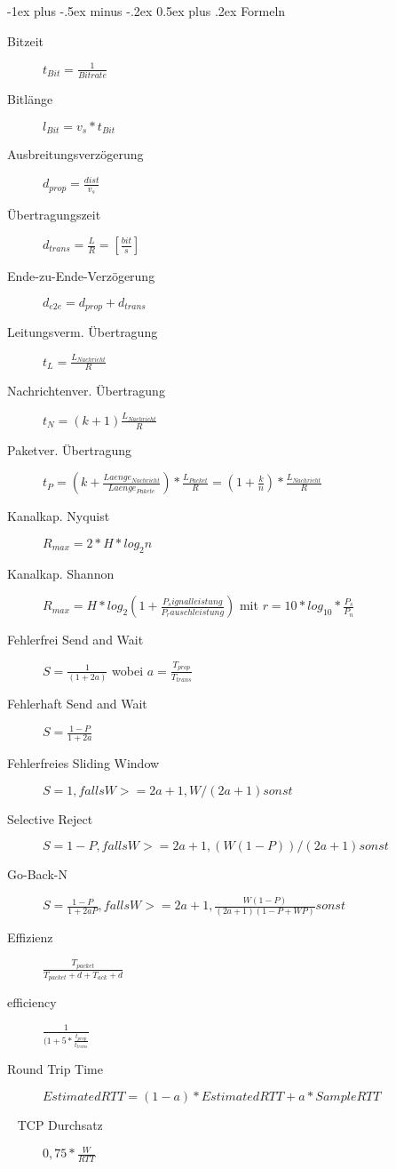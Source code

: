 \documentclass[a4paper]{article}
\makeatletter
\renewcommand{\section}{\@startsection{section}{1}{0mm}%
                                {-1ex plus -.5ex minus -.2ex}%
                                {0.5ex plus .2ex}%
                                {\normalfont\large\bfseries}}
\makeatother
\begin{document}
\begin{multicols}{3}
\end{multicols}

\section{Formeln}
\begin{multicols}{2}
    \begin{description}
        \item[Bitzeit] $t_{Bit}=\frac{1}{Bitrate}$
        \item[Bitlänge] $l_{Bit}=v_s * t_{Bit}$
        \item[Ausbreitungsverzögerung]  $d_{prop} = \frac{dist}{v_s}$
        \item[Übertragungszeit] $d_{trans} = \frac{L}{R} = [\frac{bit}{s}]$
        \item[Ende-zu-Ende-Verzögerung] $d_{e2e} = d_{prop} + d_{trans}$
        \item[Leitungsverm. Übertragung] $t_L = \frac{L_{Nachricht}}{R}$
        \item[Nachrichtenver. Übertragung] $t_N = (k + 1)\frac{L_{Nachricht}}{R}$
        \item[Paketver. Übertragung] $t_{P} = (k + \frac{Laenge_{Nachricht}}{Laenge_{Pakete}})*\frac{L_{Packet}}{R} = (1+ \frac{k}{n})* \frac{L_{Nachricht}}{R}$
        \item[Kanalkap. Nyquist] $R_{max} = 2* H * log_2n$
        \item[Kanalkap. Shannon] $R_{max} = H*log_2(1+\frac{P_signalleistung}{P_rauschleistung})$ mit $r=10*log_{10}*{\frac{P_s}{P_n}}$
        \item[Fehlerfrei Send and Wait] $S = \frac{1}{(1+2a)}$ wobei $a = \frac{T_{prop}}{T_{trans}}$
        \item[Fehlerhaft Send and Wait] $S = \frac{1-P}{1+2a}$
        \item[Fehlerfreies Sliding Window] $S = {1, falls W >= 2a+1, W/(2a+1) sonst}$
        \item[Selective Reject] $S = {1-P, falls W >= 2a+1, (W(1-P))/(2a+1) sonst}$
        \item[Go-Back-N] $S = {\frac{1-P}{1+2aP}, falls W >= 2a+1, \frac{W(1-P)}{(2a+1)(1-P+WP)} sonst}$
        \item[Effizienz] $\frac{T_{packet} }{ T_{packet} + d + T_{ack} + d}$
        \item[efficiency] $\frac{1}{ (1+ 5 * \frac{t_{prop}}{t_{trans}}}$
        \item[Round Trip Time] $EstimatedRTT = (1-a) * EstimatedRTT + a * SampleRTT$
        \item[~ TCP Durchsatz] $ 0,75 * \frac{W}{RTT}$
    \end{description}
\end{multicols}
\end{document}
